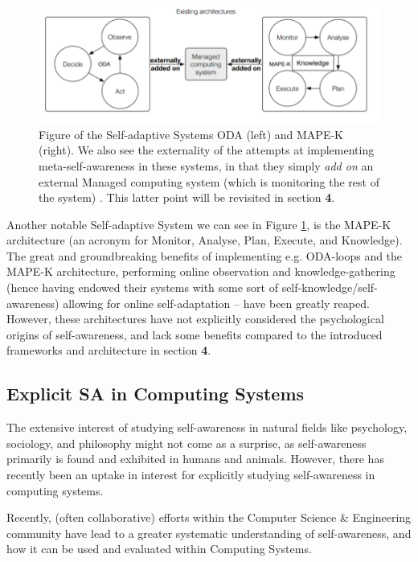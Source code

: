 \documentclass{article}
\begin{document}
\begin{figure}[ht]
\centering
\includegraphics[width=\columnwidth]{Assets/pics/oda_mapek.PNG}
\caption{Figure of the Self-adaptive Systems ODA (left) and MAPE-K (right). We also see the externality of the attempts at implementing meta-self-awareness in these systems, in that they simply \textit{add on} an external Managed computing system (which is monitoring the rest of the system) \cite{sacs16_ch4}. This latter point will be revisited in section \textbf{4}.}
\label{fig:oda_mapek}
\end{figure}

Another notable Self-adaptive System we can see in Figure \ref{fig:oda_mapek}, is the MAPE-K architecture (an acronym for Monitor, Analyse, Plan, Execute, and Knowledge). The great and groundbreaking benefits of implementing e.g. ODA-loops and the MAPE-K architecture, performing online observation and knowledge-gathering (hence having endowed their systems with some sort of self-knowledge/self-awareness) allowing for online self-adaptation -- have been greatly reaped. However, these architectures have not explicitly considered the psychological origins of self-awareness, and lack some benefits compared to the introduced frameworks and architecture in section \textbf{4}.

\newpage
\subsection{Explicit SA in Computing Systems}
The extensive interest of studying self-awareness in natural fields like psychology, sociology, and philosophy might not come as a surprise, as self-awareness primarily is found and exhibited in humans and animals. However, there has recently been an uptake in interest for explicitly studying self-awareness in computing systems.

Recently, (often collaborative) efforts within the Computer Science \& Engineering community \cite{sacs16_ch2, sacs17_ch1, sacs17_ch3} have lead to a greater systematic understanding of self-awareness, and how it can be used and evaluated within Computing Systems.
\end{document}
